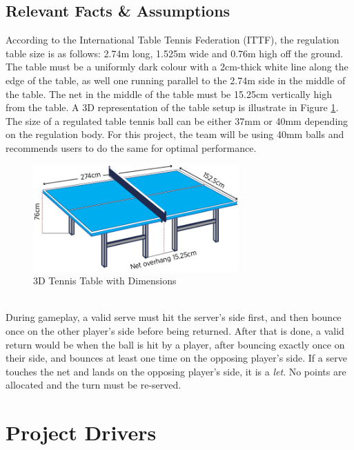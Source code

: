 \documentclass[11pt]{article}
\begin{document}
\subsection{Relevant Facts \& Assumptions}
According to the International Table Tennis Federation (ITTF), the regulation table size is as follows: 2.74m long, 1.525m wide and 0.76m high off the ground. The table must be a uniformly dark colour with a 2cm-thick white line along the edge of the table, as well one running parallel to the 2.74m side in the middle of the table. The net in the middle of the table must be 15.25cm vertically high from the table. A 3D representation of the table setup is illustrate in Figure \ref{fig:table-tennis-dim}. The size of a regulated table tennis ball can be either 37mm or 40mm depending on the regulation body. For this project, the team will be using 40mm balls and recommends users to do the same for optimal performance. \\
\begin{figure}[htbp]
   \centering
   \includegraphics[width=0.7\textwidth]{img/table-tennis-dim.png} %
   \caption{3D Tennis Table with Dimensions}
   \label{fig:table-tennis-dim}
\end{figure} \\
During gameplay, a valid serve must hit the server's side first, and then bounce once on the other player's side before being returned. After that is done, a valid return would be when the ball is hit by a player, after bouncing exactly once on their side, and bounces at least one time on the opposing player's side. If a serve touches the net and lands on the opposing player's side, it is a \textit{let}. No points are allocated and the turn must be re-served. 


\section{Project Drivers}
\end{document}
